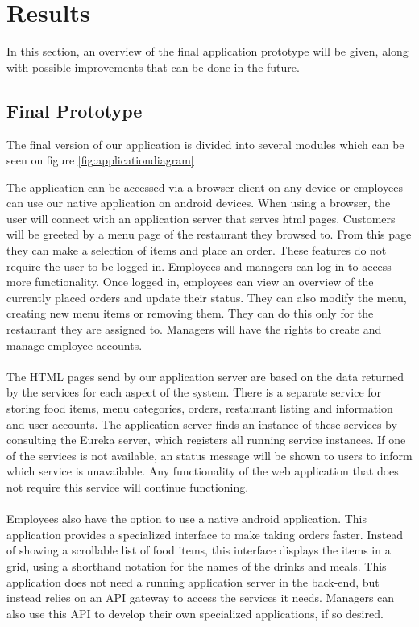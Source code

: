 \documentclass[12pt]{article}
\begin{document}
\section{Results}\label{sec:results}
\begin{multicols}{2}
\noindent In this section, an overview of the final application prototype will be given, along with possible improvements that can be done in the future.
\subsection{Final Prototype}
The final version of our application is divided into several modules which can be seen on figure \ref{fig:applicationdiagram}

\noindent The application can be accessed via a browser client on any device or employees can use our native application on android devices. When using a browser, the user will connect with an application server that serves html pages. Customers will be greeted by a menu page of the restaurant they browsed to. From this page they can make a selection of items and place an order. These features do not require the user to be logged in. Employees and managers can log in to access more functionality. Once logged in, employees can view an overview of the currently placed orders and update their status. They can also modify the menu, creating new menu items or removing them. They can do this only for the restaurant they are assigned to. Managers will have the rights to create and manage employee accounts.
\\\\
The HTML pages send by our application server are based on the data returned by the services for each aspect of the system. There is a separate service for storing food items, menu categories, orders, restaurant listing and information and user accounts. The application server finds an instance of these services by consulting the Eureka server, which registers all running service instances. If one of the services is not available, an status message will be shown to users to inform which service is unavailable. Any functionality of the web application that does not require this service will continue functioning.
\\\\ 
Employees also have the option to use a native android application. This application provides a specialized interface to make taking orders faster. Instead of showing a scrollable list of food items, this interface displays the items in a grid, using a shorthand notation for the names of the drinks and meals. This application does not need a running application server in the back-end, but instead relies on an API gateway to access the services it needs. Managers can also use this API to develop their own specialized applications, if so desired.

\end{multicols}
\end{document}
